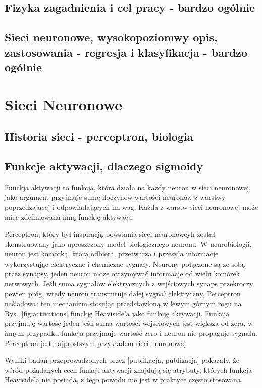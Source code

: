 \documentclass[11pt]{book}
\theoremstyle{definition}
\begin{document}
\section{Fizyka zagadnienia i cel pracy - bardzo ogólnie}
\section{Sieci neuronowe, wysokopoziomwy opis, zastosowania - regresja i klasyfikacja - bardzo ogólnie}


\chapter{Sieci Neuronowe}
\section{Historia sieci - perceptron, biologia}
\section{Funkcje aktywacji, dlaczego sigmoidy}
Funckja aktywacji to funkcja, która działa na każdy neuron w sieci neuronowej, jako argument przyjmuje sumę iloczynów wartości neuronów z warstwy poprzedzającej i odpowiadających im wag. Każda z warstw sieci neuronowej może mieć zdefiniowaną inną funckję aktywacji.

Perceptron, który był inspiracją powstania sieci neuronowcyh został skonstruowany jako uproszczony model biologicznego neuronu. W neurobiologii, neuron jest 
komórką, która odbiera, przetwarza i przesyła informacje wykorzystując elektryczne i chemiczne sygnały. Neurony połączone są ze sobą przez synapsy, jeden neuron może otrzymywać informacje od wielu komórek nerwowych. Jeśli suma sygnałów elektrycznych z wejściowych synaps przekroczy pewien próg, wtedy neuron transmituje dalej sygnał elektryczny. Perceptron naśladował ten mechanizm stosując przedstawioną w lewym górnym rogu na Rys.~\ref{fig:activations} funckję Heaviside'a jako funkcję aktywacji. Funkcja przyjmuję wartość jeden jeśli suma wartości wejściowych jest większa od zera, w innym przypadku funkcja przyjmuje wartość zero i neuron nie propaguje sygnału. Perceptron jest najprostszym przykładem sieci neuronowej.

Wyniki badań przeprowadzonych przez [publikacja, publikacja] pokazały, że wśród pożądanych cech funkcji aktywacji znajdują się atrybuty, których funkcja Heaviside'a nie posiada, z tego powodu nie jest w praktyce często stosowana.
\end{document}
